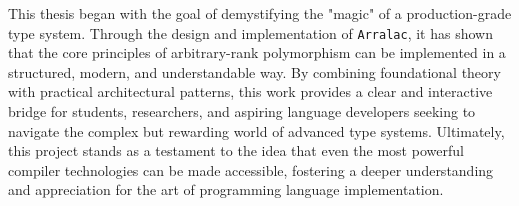 This thesis began with the goal of demystifying the "magic" of a production-grade type system. Through the design and implementation of \texttt{Arralac}, it has shown that the core principles of arbitrary-rank polymorphism can be implemented in a structured, modern, and understandable way. By combining foundational theory with practical architectural patterns, this work provides a clear and interactive bridge for students, researchers, and aspiring language developers seeking to navigate the complex but rewarding world of advanced type systems. Ultimately, this project stands as a testament to the idea that even the most powerful compiler technologies can be made accessible, fostering a deeper understanding and appreciation for the art of programming language implementation.